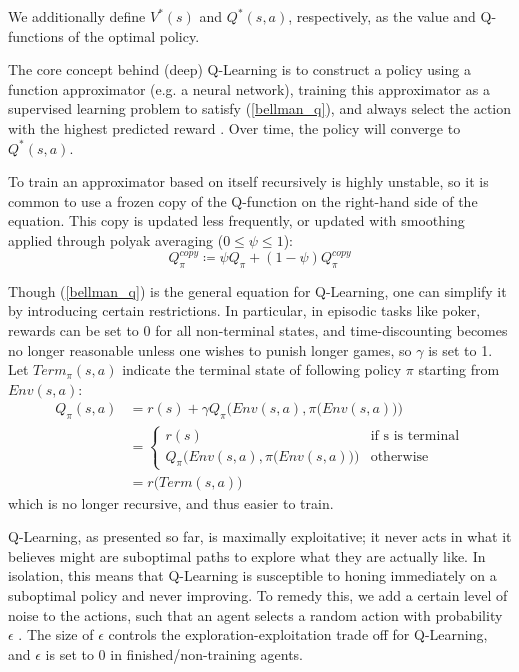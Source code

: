 We additionally define $V^*(s)$ and $Q^*(s, a)$, respectively, as the value and Q-functions of the optimal policy.

The core concept behind (deep) Q-Learning is to construct a policy using a function approximator (e.g. a neural network), training this approximator as a supervised learning problem to satisfy (\ref{bellman_q}), and always select the action with the highest predicted reward \cite{QlearningMnih}.
Over time, the policy will converge to $Q^*(s, a)$.\cite{Qlearn_convergence}

To train an approximator based on itself recursively is highly unstable, so it is common to use a frozen copy of the Q-function on the right-hand side of the equation. This copy is updated less frequently, or updated with smoothing applied through polyak averaging ($0 \leq \psi \leq 1$):
\begin{equation}
    Q_{\pi}^{copy} \coloneqq \psi Q_{\pi} + (1 - \psi) Q_{\pi}^{copy}
\end{equation}

Though (\ref{bellman_q}) is the general equation for Q-Learning, one can simplify it by introducing certain restrictions. In particular, in episodic tasks like poker, rewards can be set to 0 for all non-terminal states, and time-discounting becomes no longer reasonable unless one wishes to punish longer games, so $\gamma$ is set to 1. Let $Term_{\pi}(s, a)$ indicate the terminal state of following policy $\pi$ starting from $Env(s, a)$:
\begin{equation}
\label{Qlearn_nobellman}
\begin{split}
Q_{\pi}(s, a) &= r(s) + \gamma Q_{\pi}\Big(Env(s, a), \pi\big(Env(s, a)\big)\Big)\\
&= \begin{cases}
r(s) &\mbox{if s is terminal} \\
Q_{\pi}\Big(Env(s, a), \pi\big(Env(s, a)\big)\Big) &\mbox{otherwise}
\end{cases}\\
&= r\big(Term(s, a)\big)
\end{split}
\end{equation}
which is no longer recursive, and thus easier to train.

Q-Learning, as presented so far, is maximally exploitative; it never acts in what it believes might are suboptimal paths to explore what they are actually like. In isolation, this means that Q-Learning is susceptible to honing immediately on a suboptimal policy and never improving. To remedy this, we add a certain level of noise to the actions, such that an agent selects a random action with probability $\epsilon$ \cite[chapters 2.2 \& 2.3]{Sutton}. The size of $\epsilon$ controls the exploration-exploitation trade off for Q-Learning, and $\epsilon$ is set to 0 in finished/non-training agents.

